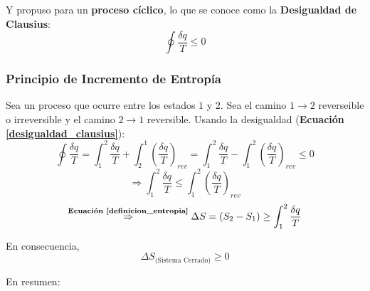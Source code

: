         Y propuso para un \textbf{proceso cíclico}, lo que se conoce como la \textbf{Desigualdad de Clausius}:
        \begin{equation}
        \label{desigualdad_clausius}
            \oint \frac{\delta q}{T} \leq 0
        \end{equation}
        
        \subsubsection{Principio de Incremento de Entropía}
        
        Sea un proceso que ocurre entre los estados \(1\) y \(2\). Sea el camino \(1\rightarrow2\) reverseible o irreversible y el camino \(2\rightarrow1\) reversible. Usando la desigualdad (\textbf{Ecuación \ref{desigualdad_clausius}}):
        \[\oint \frac{\delta q}{T}=\int_{1}^{2} \frac{\delta q}{T}+\int_{2}^{1} \left ( \frac{\delta q}{T} \right )_{rev}=\int_{1}^{2} \frac{\delta q}{T}-\int_{1}^{2} \left ( \frac{\delta q}{T} \right )_{rev} \leq 0\]
        \[\Rightarrow \int_{1}^{2} \frac{\delta q}{T} \leq \int_{1}^{2} \left ( \frac{\delta q}{T} \right )_{rev}\]
        \[\overset{\text{\textbf{Ecuación \ref{definicion_entropia}}}}{\Rightarrow} \Delta S=(S_{2}-S_{1}) \geq \int_{1}^{2} \frac{\delta q}{T}\]
        
        \begin{quote}
            \textit{}
        \end{quote}
        
        En consecuencia,
        \begin{equation}
        \label{principio_entropia}
            \Delta S_{\text{(Sistema Cerrado)}} \geq 0
        \end{equation}
        
        En resumen:
        
        \begin{quote}
            \textit{}
        \end{quote}
        \begin{quote}
            \textit{}
        \end{quote}
        
